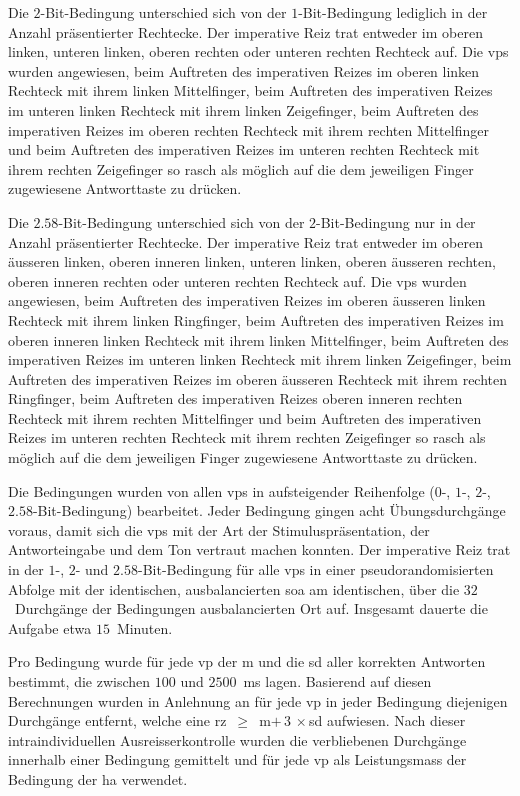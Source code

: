 \documentclass[11pt, twoside, a4paper]{book}		%
\begin{document}
Die $2$-Bit-Bedingung unterschied sich von der $1$-Bit-Bedingung lediglich in der Anzahl präsentierter Rechtecke. Der imperative Reiz trat entweder im oberen linken, unteren linken, oberen rechten oder unteren rechten Rechteck auf. Die \glspl{vp} wurden angewiesen, beim Auftreten des imperativen Reizes im oberen linken Rechteck mit ihrem linken Mittelfinger, beim Auftreten des imperativen Reizes im unteren linken Rechteck mit ihrem linken Zeigefinger,  beim Auftreten des imperativen Reizes im oberen rechten Rechteck mit ihrem rechten Mittelfinger und beim Auftreten des imperativen Reizes im unteren rechten Rechteck mit ihrem rechten Zeigefinger so rasch als möglich auf die dem jeweiligen Finger zugewiesene Antworttaste zu drücken.

Die $2.58$-Bit-Bedingung unterschied sich von der $2$-Bit-Bedingung nur in der Anzahl präsentierter Rechtecke. Der imperative Reiz trat entweder im oberen äusseren linken, oberen inneren linken, unteren linken, oberen äusseren rechten, oberen inneren rechten oder unteren rechten Rechteck auf. Die \glspl{vp} wurden angewiesen, beim Auftreten des imperativen Reizes im oberen äusseren linken Rechteck mit ihrem linken Ringfinger, beim Auftreten des imperativen Reizes im oberen inneren linken Rechteck mit ihrem linken Mittelfinger, beim Auftreten des imperativen Reizes im unteren linken Rechteck mit ihrem linken Zeigefinger, beim Auftreten des imperativen Reizes im oberen äusseren Rechteck mit ihrem rechten Ringfinger, beim Auftreten des imperativen Reizes oberen inneren rechten Rechteck mit ihrem rechten Mittelfinger und beim Auftreten des imperativen Reizes im unteren rechten Rechteck mit ihrem rechten Zeigefinger so rasch als möglich auf die dem jeweiligen Finger zugewiesene Antworttaste zu drücken.

Die Bedingungen wurden von allen \glspl{vp} in aufsteigender Reihenfolge ($0$-, $1$-, $2$-, $2.58$-Bit-Bedingung) bearbeitet. Jeder Bedingung gingen acht  Übungsdurchgänge voraus, damit sich die \glspl{vp} mit der Art der Stimuluspräsentation, der Antworteingabe und dem Ton vertraut machen konnten. 
Der imperative Reiz trat in der $1$-, $2$- und $2.58$-Bit-Bedingung für alle \glspl{vp} in einer pseudorandomisierten Abfolge mit der identischen, ausbalancierten \gls{soa} am identischen, über die $32$~Durchgänge der Bedingungen ausbalancierten Ort auf. Insgesamt dauerte die Aufgabe etwa $15$~Minuten. 

Pro Bedingung wurde für jede \gls{vp} der \gls{m} und die \gls{sd} aller korrekten Antworten bestimmt, die zwischen $100$ und $2500$~ms lagen. Basierend auf diesen Berechnungen wurden in Anlehnung an \citet{Moosbrugger2006} für jede \gls{vp} in jeder Bedingung diejenigen Durchgänge entfernt, welche eine \mbox{\gls{rz} $\geq$ \gls{m}$+\,3\,\times$\gls{sd}} aufwiesen. Nach dieser intraindividuellen Ausreisserkontrolle wurden die verbliebenen Durchgänge innerhalb einer Bedingung gemittelt und für jede \gls{vp} als Leistungsmass der Bedingung der \gls{ha} verwendet.
\end{document}
